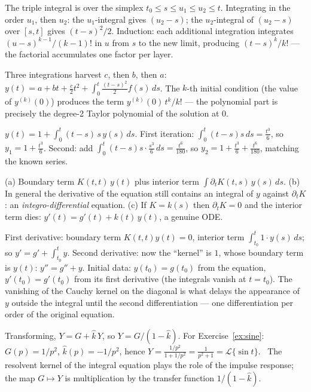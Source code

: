 \documentclass{essay}
\begin{document}
\begin{description}[leftmargin=0pt, itemsep=6pt]
\item[\ref{ex:cauchy3}.] The triple integral is over the simplex $t_0 \le s \le u_1 \le u_2 \le t$. Integrating in the order $u_1$, then $u_2$: the $u_1$-integral gives $(u_2 - s)$; the $u_2$-integral of $(u_2 - s)$ over $[s, t]$ gives $(t-s)^2/2$. Induction: each additional integration integrates $(u - s)^{k-1}/(k-1)!$ in $u$ from $s$ to the new limit, producing $(t-s)^k/k!$ --- the factorial accumulates one factor per layer.

\item[\ref{ex:thirdorder}.] Three integrations harvest $c$, then $b$, then $a$:
$y(t) = a + bt + \tfrac{c}{2}t^2 + \int_0^t \tfrac{(t-s)^2}{2} f(s)\,ds$. The $k$-th initial condition (the value of $y^{(k)}(0)$) produces the term $y^{(k)}(0)\, t^k / k!$ --- the polynomial part is precisely the degree-2 Taylor polynomial of the solution at $0$.

\item[\ref{ex:airy}.] $y(t) = 1 + \int_0^t (t-s)\,s\,y(s)\,ds$. First iteration: $\int_0^t (t-s)s\,ds = \tfrac{t^3}{6}$, so $y_1 = 1 + \tfrac{t^3}{6}$. Second: add $\int_0^t (t-s)s\cdot\tfrac{s^3}{6}\,ds = \tfrac{t^6}{180}$, so $y_2 = 1 + \tfrac{t^3}{6} + \tfrac{t^6}{180}$, matching the known series.

\item[\ref{ex:leibniz}.] (a) Boundary term $K(t,t)\,y(t)$ plus interior term $\int \partial_t K(t,s)\,y(s)\,ds$. (b) In general the derivative of the equation still contains an integral of $y$ against $\partial_t K$: an \emph{integro-differential} equation. (c) If $K = k(s)$ then $\partial_t K = 0$ and the interior term dies: $y'(t) = g'(t) + k(t)\,y(t)$, a genuine ODE.

\item[\ref{ex:twoderivs}.] First derivative: boundary term $K(t,t)y(t) = 0$, interior term $\int_{t_0}^t 1 \cdot y(s)\,ds$; so $y' = g' + \int_{t_0}^t y$. Second derivative: now the ``kernel'' is $1$, whose boundary term is $y(t)$: $y'' = g'' + y$. Initial data: $y(t_0) = g(t_0)$ from the equation, $y'(t_0) = g'(t_0)$ from its first derivative (the integrals vanish at $t = t_0$). The vanishing of the Cauchy kernel on the diagonal is what delays the appearance of $y$ outside the integral until the second differentiation --- one differentiation per order of the original equation.

\item[\ref{ex:convolution}.] Transforming, $Y = G + \widehat{k}\,Y$, so $Y = G/(1 - \widehat{k})$. For Exercise~\ref{ex:sine}: $G(p) = 1/p^2$, $\widehat{k}(p) = -1/p^2$, hence $Y = \frac{1/p^2}{1 + 1/p^2} = \frac{1}{p^2+1} = \mathcal{L}\{\sin t\}$. \checkmark\ The resolvent kernel of the integral equation plays the role of the impulse response; the map $G \mapsto Y$ is multiplication by the transfer function $1/(1-\widehat{k})$.


\end{description}
\end{document}
